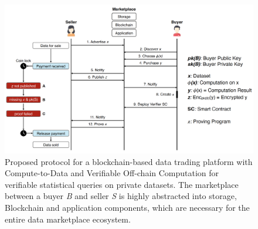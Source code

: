 
\begin{figure}[!htb]
    \centering
    \includegraphics[width=14cm]{images/protocol.png}
    \caption{Proposed protocol for a blockchain-based data trading platform with Compute-to-Data and Verifiable Off-chain Computation for verifiable statistical queries on private datasets. The marketplace between a buyer \emph{B} and seller \emph{S} is highly abstracted into storage, Blockchain and application components, which are necessary for the entire data marketplace ecosystem.}
    \label{fig:usecase}
\end{figure}


